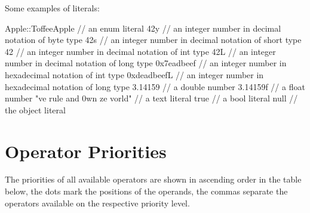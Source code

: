 \begin{example}
Some examples of literals:
\begin{grgen}
Apple::ToffeeApple // an enum literal
42y // an integer number in decimal notation of byte type
42s // an integer number in decimal notation of short type
42 // an integer number in decimal notation of int type
42L // an integer number in decimal notation of long type
0x7eadbeef // an integer number in hexadecimal notation of int type
0xdeadbeefL // an integer number in hexadecimal notation of long type
3.14159 // a double number
3.14159f // a float number
"ve rule and 0wn ze vorld" // a text literal
true // a bool literal
null // the object literal
\end{grgen}
\end{example}


\section{Operator Priorities}

The priorities of all available operators are shown in ascending order in the table below, the dots mark the positions of the operands, the commas separate the operators available on the respective priority level.

